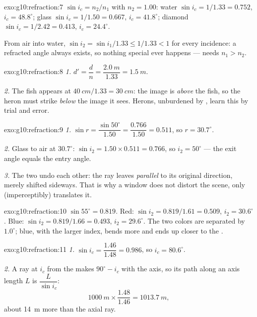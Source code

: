 \begin{solution}{exo:g10:refraction:7}
$\sin i_c = n_2/n_1$ with $n_2 = 1.00$:
water $\sin i_c = 1/1.33 = 0.752$, $i_c = 48.8^\circ$;
glass $\sin i_c = 1/1.50 = 0.667$, $i_c = 41.8^\circ$;
diamond $\sin i_c = 1/2.42 = 0.413$, $i_c = 24.4^\circ$.

From air into water, $\sin i_2 = \sin i_1/1.33 \leq 1/1.33 < 1$ for
every incidence: a refracted angle always exists, so nothing special
ever happens ---  needs $n_1 > n_2$.
\end{solution}

\begin{solution}{exo:g10:refraction:8}
\emph{1.} $d' = \dfrac{d}{n} = \dfrac{\qty{2.0}{m}}{1.33}
= \qty{1.5}{m}$.

\emph{2.} The fish appears at $\qty{40}{cm}/1.33 = \qty{30}{cm}$: the
image is \emph{above} the fish, so the heron must strike \emph{below}
the image it sees. Herons, unburdened by , learn this by
trial and error.
\end{solution}

\begin{solution}{exo:g10:refraction:9}
\emph{1.} $\sin r = \dfrac{\sin 50^\circ}{1.50} = \dfrac{0.766}{1.50}
= 0.511$, so $r = 30.7^\circ$.

\emph{2.} Glass to air at $30.7^\circ$:
$\sin i_2 = 1.50 \times 0.511 = 0.766$, so $i_2 = 50^\circ$ --- the
exit angle equals the entry angle.

\emph{3.} The two  undo each other: the ray leaves
\emph{parallel} to its original direction, merely shifted sideways.
That is why a window does not distort the scene, only (imperceptibly)
translates it.
\end{solution}

\begin{solution}{exo:g10:refraction:10}
$\sin 55^\circ = 0.819$. Red:
$\sin i_2 = 0.819/1.61 = 0.509$, $i_2 = 30.6^\circ$. Blue:
$\sin i_2 = 0.819/1.66 = 0.493$, $i_2 = 29.6^\circ$. The two colors are
separated by $1.0^\circ$; blue, with the larger index, bends more and
ends up closer to the .
\end{solution}

\begin{solution}{exo:g10:refraction:11}
\emph{1.} $\sin i_c = \dfrac{1.46}{1.48} = 0.986$, so
$i_c = 80.6^\circ$.

\emph{2.} A ray at $i_c$ from the  makes $90^\circ - i_c$ with
the axis, so its path along an axis length $L$ is $\dfrac{L}{\sin i_c}$:
\[
\qty{1000}{m} \times \frac{1.48}{1.46} = \qty{1013.7}{m},
\]
about \qty{14}{m} more than the axial ray.
\end{solution}

